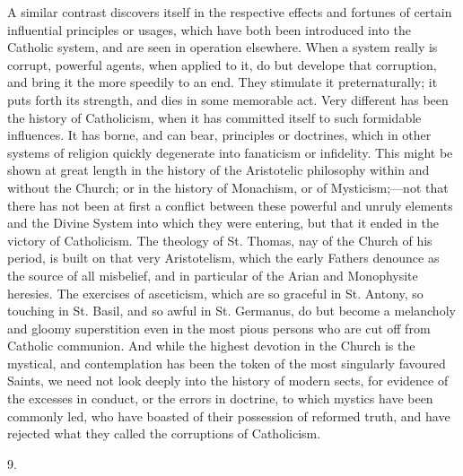 A similar contrast discovers itself in the respective effects and
fortunes of certain influential principles or usages, which have both
been introduced into the Catholic system, and are seen in operation
elsewhere. When a system really is corrupt, powerful agents, when
applied to it, do but develope that corruption, and bring it the more
speedily to an end. They stimulate it preternaturally; it puts forth
its strength, and dies in some memorable act. Very different has been
the history of Catholicism, when it has committed itself to such
formidable influences. It has borne, and can bear, principles or
doctrines, which in other systems of religion quickly degenerate into
fanaticism or infidelity. This might be shown at great length in the
history of the Aristotelic philosophy within and without the Church;
or in the history of Monachism, or of Mysticism;—not that there has
not been at first a conflict between these powerful and unruly
elements and the Divine System into which they were entering, but that
it ended in the victory of Catholicism. The theology of St. Thomas,
nay of the Church of his period, is built on that very Aristotelism,
which the early Fathers denounce as the source of all misbelief, and
in particular of the Arian and Monophysite heresies. The exercises of
asceticism, which are so graceful in St. Antony, so touching in St.
Basil, and so awful in St. Germanus, do but become a melancholy and
gloomy superstition even in the most pious persons who are cut off
from Catholic communion. And while the highest devotion in the Church
is the mystical, and contemplation has been the token of the most
singularly favoured Saints, we need not look deeply into the history
of modern sects, for evidence of the excesses in conduct, or the
errors in doctrine, to which mystics have been commonly led, who have
boasted of their possession of reformed truth, and have rejected what
they called the corruptions of Catholicism.

9.

